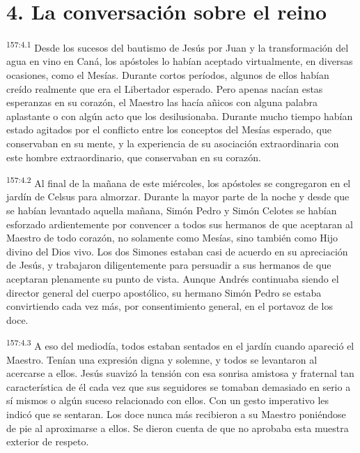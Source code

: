 \section*{4. La conversación sobre el reino}
\par 
\textsuperscript{157:4.1} Desde los sucesos del bautismo de Jesús por Juan y la transformación del agua en vino en Caná, los apóstoles lo habían aceptado virtualmente, en diversas ocasiones, como el Mesías. Durante cortos períodos, algunos de ellos habían creído realmente que era el Libertador esperado. Pero apenas nacían estas esperanzas en su corazón, el Maestro las hacía añicos con alguna palabra aplastante o con algún acto que los desilusionaba. Durante mucho tiempo habían estado agitados por el conflicto entre los conceptos del Mesías esperado, que conservaban en su mente, y la experiencia de su asociación extraordinaria con este hombre extraordinario, que conservaban en su corazón.

\par 
\textsuperscript{157:4.2} Al final de la mañana de este miércoles, los apóstoles se congregaron en el jardín de Celsus para almorzar. Durante la mayor parte de la noche y desde que se habían levantado aquella mañana, Simón Pedro y Simón Celotes se habían esforzado ardientemente por convencer a todos sus hermanos de que aceptaran al Maestro de todo corazón, no solamente como Mesías, sino también como Hijo divino del Dios vivo. Los dos Simones estaban casi de acuerdo en su apreciación de Jesús, y trabajaron diligentemente para persuadir a sus hermanos de que aceptaran plenamente su punto de vista. Aunque Andrés continuaba siendo el director general del cuerpo apostólico, su hermano Simón Pedro se estaba convirtiendo cada vez más, por consentimiento general, en el portavoz de los doce.

\par 
\textsuperscript{157:4.3} A eso del mediodía, todos estaban sentados en el jardín cuando apareció el Maestro. Tenían una expresión digna y solemne, y todos se levantaron al acercarse a ellos. Jesús suavizó la tensión con esa sonrisa amistosa y fraternal tan característica de él cada vez que sus seguidores se tomaban demasiado en serio a sí mismos o algún suceso relacionado con ellos. Con un gesto imperativo les indicó que se sentaran. Los doce nunca más recibieron a su Maestro poniéndose de pie al aproximarse a ellos. Se dieron cuenta de que no aprobaba esta muestra exterior de respeto.

